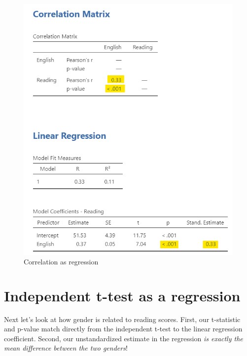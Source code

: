 \documentclass[
]{book}
\begin{document}
\begin{figure}

{\centering \includegraphics[width=1\linewidth]{images/14-regression-wrap-up/correlation} 

}

\caption{Correlation as regression}\label{fig:unnamed-chunk-1}
\end{figure}

\hypertarget{independent-t-test-as-a-regression}{%
\section{Independent t-test as a regression}\label{independent-t-test-as-a-regression}}

Next let's look at how gender is related to reading scores. First, our t-statistic and p-value match directly from the independent t-test to the linear regression coefficient. Second, our unstandardized estimate in the regression \emph{is exactly the mean difference between the two genders}!
\end{document}
